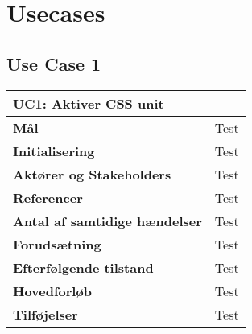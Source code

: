 \section{Usecases}

\subsection{Use Case 1}
\begin{table}[H] \centering
\begin{tabular}{|p{6cm}|p{8cm}|}
	\hline
\multicolumn{2}{|l|}{\textbf{UC1: Aktiver CSS unit}} \\\hline
\textbf{Mål}								&Test \\\hline
\textbf{Initialisering}					&Test \\\hline
\textbf{Aktører og Stakeholders}			&Test \\\hline
\textbf{Referencer}						&Test \\\hline
\textbf{Antal af samtidige hændelser}	&Test \\\hline
\textbf{Forudsætning}					&Test \\\hline
\textbf{Efterfølgende tilstand}			&Test \\\hline
\textbf{Hovedforløb}						&Test \\\hline
\textbf{Tilføjelser}						&Test \\\hline
	\end{tabular}
	\label{UC1} 
\end{table}

